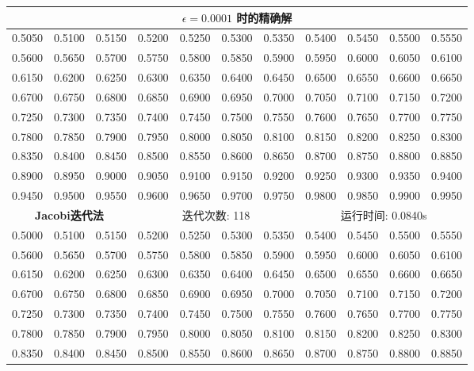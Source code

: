 \documentclass{article}
\begin{document}
\begin{table}[H]
	\centering
	\begin{tabular}{|*{11}{c}|}
		\hline
		\multicolumn{11}{|c|}{\textbf{$\epsilon = 0.0001$ 时的精确解}}\\
		\hline
		0.5050 & 0.5100 & 0.5150 & 0.5200 & 0.5250 & 0.5300 & 0.5350 & 0.5400 & 0.5450 & 0.5500 & 0.5550 \\
		0.5600 & 0.5650 & 0.5700 & 0.5750 & 0.5800 & 0.5850 & 0.5900 & 0.5950 & 0.6000 & 0.6050 & 0.6100 \\
		0.6150 & 0.6200 & 0.6250 & 0.6300 & 0.6350 & 0.6400 & 0.6450 & 0.6500 & 0.6550 & 0.6600 & 0.6650 \\
		0.6700 & 0.6750 & 0.6800 & 0.6850 & 0.6900 & 0.6950 & 0.7000 & 0.7050 & 0.7100 & 0.7150 & 0.7200 \\
		0.7250 & 0.7300 & 0.7350 & 0.7400 & 0.7450 & 0.7500 & 0.7550 & 0.7600 & 0.7650 & 0.7700 & 0.7750 \\
		0.7800 & 0.7850 & 0.7900 & 0.7950 & 0.8000 & 0.8050 & 0.8100 & 0.8150 & 0.8200 & 0.8250 & 0.8300 \\
		0.8350 & 0.8400 & 0.8450 & 0.8500 & 0.8550 & 0.8600 & 0.8650 & 0.8700 & 0.8750 & 0.8800 & 0.8850 \\
		0.8900 & 0.8950 & 0.9000 & 0.9050 & 0.9100 & 0.9150 & 0.9200 & 0.9250 & 0.9300 & 0.9350 & 0.9400 \\
		0.9450 & 0.9500 & 0.9550 & 0.9600 & 0.9650 & 0.9700 & 0.9750 & 0.9800 & 0.9850 & 0.9900 & 0.9950 \\
		\hline
		\multicolumn{3}{|c}{\textbf{Jacobi迭代法}} & \multicolumn{4}{|c}{迭代次数: 118}\ & \multicolumn{4}{|c|}{运行时间: 0.0840s}\\
		\hline
		0.5000 & 0.5100 & 0.5150 & 0.5200 & 0.5250 & 0.5300 & 0.5350 & 0.5400 & 0.5450 & 0.5500 & 0.5550 \\
		0.5600 & 0.5650 & 0.5700 & 0.5750 & 0.5800 & 0.5850 & 0.5900 & 0.5950 & 0.6000 & 0.6050 & 0.6100 \\
		0.6150 & 0.6200 & 0.6250 & 0.6300 & 0.6350 & 0.6400 & 0.6450 & 0.6500 & 0.6550 & 0.6600 & 0.6650 \\
		0.6700 & 0.6750 & 0.6800 & 0.6850 & 0.6900 & 0.6950 & 0.7000 & 0.7050 & 0.7100 & 0.7150 & 0.7200 \\
		0.7250 & 0.7300 & 0.7350 & 0.7400 & 0.7450 & 0.7500 & 0.7550 & 0.7600 & 0.7650 & 0.7700 & 0.7750 \\
		0.7800 & 0.7850 & 0.7900 & 0.7950 & 0.8000 & 0.8050 & 0.8100 & 0.8150 & 0.8200 & 0.8250 & 0.8300 \\
		0.8350 & 0.8400 & 0.8450 & 0.8500 & 0.8550 & 0.8600 & 0.8650 & 0.8700 & 0.8750 & 0.8800 & 0.8850 \\

\end{tabular}
\end{table}
\end{document}
